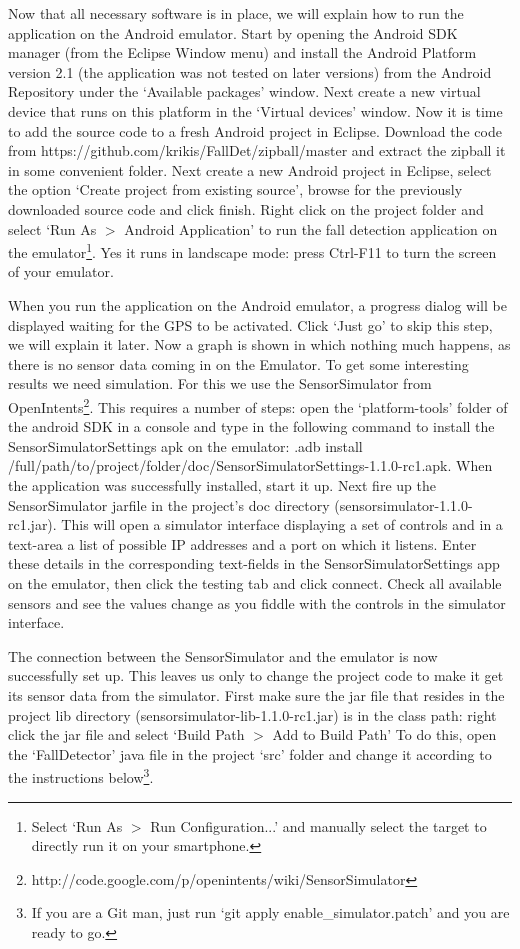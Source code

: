 \documentclass[a4paper, 10pt]{article}
\begin{document}
Now that all necessary software is in place, we will explain how to run the application on the Android emulator. Start by opening the Android SDK manager (from the Eclipse Window menu) and install the Android Platform version 2.1 (the application was not tested on later versions) from the Android Repository under the `Available packages' window. Next create a new virtual device that runs on this platform in the `Virtual devices' window. Now it is time to add the source code to a fresh Android project in Eclipse. Download the code from https://github.com/krikis/FallDet/zipball/master and extract the zipball it in some convenient folder. Next create a new Android project in Eclipse, select the option `Create project from existing source', browse for the previously downloaded source code and click finish. Right click on the project folder and select `Run As $>$ Android Application' to run the fall detection application on the emulator\footnote{Select `Run As $>$ Run Configuration...' and manually select the target to directly run it on your smartphone.}. Yes it runs in landscape mode: press Ctrl-F11 to turn the screen of your emulator.

When you run the application on the Android emulator, a progress dialog will be displayed waiting for the GPS to be activated. Click `Just go' to skip this step, we will explain it later. Now a graph is shown in which nothing much happens, as there is no sensor data coming in on the Emulator. To get some interesting results we need simulation. For this we use the SensorSimulator from OpenIntents\footnote{http://code.google.com/p/openintents/wiki/SensorSimulator}. This requires a number of steps: open the `platform-tools' folder of the android SDK in a console and type in the following command to install the SensorSimulatorSettings apk on the emulator: .adb install /full/path/to/project/folder/doc/SensorSimulatorSettings-1.1.0-rc1.apk. When the application was successfully installed, start it up. Next fire up the SensorSimulator jarfile in the project's doc directory (sensorsimulator-1.1.0-rc1.jar). This will open a simulator interface displaying a set of controls and in a text-area a list of possible IP addresses and a port on which it listens. Enter these details in the corresponding text-fields in the SensorSimulatorSettings app on the emulator, then click the testing tab and click connect. Check all available sensors and see the values change as you fiddle with the controls in the simulator interface.

The connection between the SensorSimulator and the emulator is now successfully set up. This leaves us only to change the project code to make it get its sensor data from the simulator. First make sure the jar file that resides in the project lib directory (sensorsimulator-lib-1.1.0-rc1.jar) is in the class path: right click the jar file and select `Build Path $>$ Add to Build Path'  To do this, open the `FallDetector' java file in the project `src' folder and change it according to the instructions below\footnote{If you are a Git man, just run `git apply enable\_simulator.patch' and you are ready to go.}.
\end{document}
